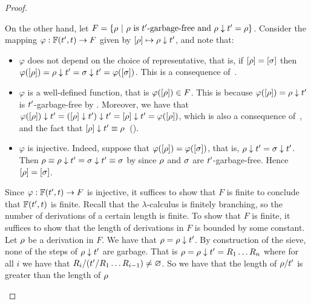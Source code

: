 \begin{proof}
\begin{enumerate}
\begin{enumerate}
    On the other hand, let $F = \{\rho \ |\  \rho \text{ is $t'$-garbage-free and } \rho \downarrow t' = \rho\}$.
    Consider the mapping $\varphi : \mathbb{F}(t', t) \to F$
    given by ${[\rho]} \mapsto \rho \downarrow t'$, and note that:
    \begin{itemize}
    \item
      $\varphi$ does not depend on the choice of representative,
      that is, if ${[\rho]} = {[\sigma]}$ then $\varphi({[\rho]}) = \rho \downarrow t' = \sigma \downarrow t' = \varphi({[\sigma]})$.
      This is a consequence of~.
    \item
      $\varphi$ is a well-defined function, that is $\varphi({[\rho]}) \in F$.
      This is because $\varphi({[\rho]}) = \rho \downarrow t'$ is $t'$-garbage-free by .
      Moreover, we have that $\varphi({[\rho]}) \downarrow t' = ({[\rho]} \downarrow t') \downarrow t' = {[\rho]} \downarrow t'= \varphi({[\rho]})$,
      which is also a consequence of~,
      and the fact that ${[\rho]} \downarrow t' \equiv \rho$~().
    \item
      $\varphi$ is injective. Indeed, suppose that $\varphi({[\rho]}) = \varphi({[\sigma]})$,
      that is, $\rho \downarrow t' = \sigma \downarrow t'$.
      Then $\rho \equiv \rho \downarrow t' = \sigma \downarrow t' \equiv \sigma$
      by  since $\rho$ and $\sigma$ are $t'$-garbage-free.
      Hence ${[\rho]} = {[\sigma]}$.
    \end{itemize}
    Since $\varphi : \mathbb{F}(t', t) \to F$ is injective, it suffices to show that $F$ is finite
    to conclude that $\mathbb{F}(t', t)$ is finite.
    Recall that the $\lambda$-calculus is finitely branching, so the number of derivations of a certain length
    is finite. To show that $F$ is finite, it suffices to show that the length of derivations in $F$ is
    bounded by some constant.
    Let $\rho$ be a derivation in $F$. We have that $\rho = \rho \downarrow t'$.
    By construction of the sieve, none of the steps of $\rho \downarrow t'$ are garbage.
    That is $\rho = \rho \downarrow t' = R_1\hdots R_n$ where for all $i$ we have that
    $R_i/(t'/R_1\hdots R_{i-1}) \neq \varnothing$.
    So we have that the length of $\rho/t'$ is greater than the length of $\rho$

\end{enumerate}
\end{enumerate}
\end{proof}
